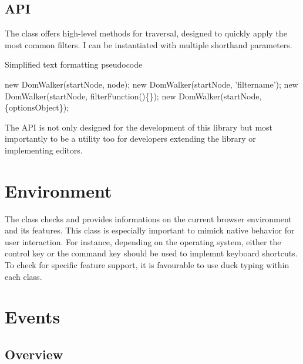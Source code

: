 \subsection{API}

The  class offers high-level methods for traversal, designed to quickly apply the most common filters. I can be instantiated with multiple shorthand parameters.

\begin{algorithm}
\caption{Simplified text formatting pseudocode}
\label{alg:format_pseudocode}
\begin{algorithmic}[1]
\State new DomWalker(startNode, node);
\State new DomWalker(startNode, 'filtername');
\State new DomWalker(startNode, filterFunction()\{\});
\State new DomWalker(startNode,\{optionsObject\});
\end{algorithmic}
\end{algorithm}

\noindent The API is not only designed for the development of this library but most importantly to be a utility too for developers extending the library or implementing editors.



\section{Environment}

The  class checks and provides informations on the current browser environment and its features. This class is especially important to mimick native behavior for user interaction. For instance, depending on the operating system, either the control key or the command key should be used to implemnt keyboard shortcuts. To check for specific feature support, it is favourable to use duck typing within each class.


\section{Events}
\label{sec:events}
\subsection{Overview}

